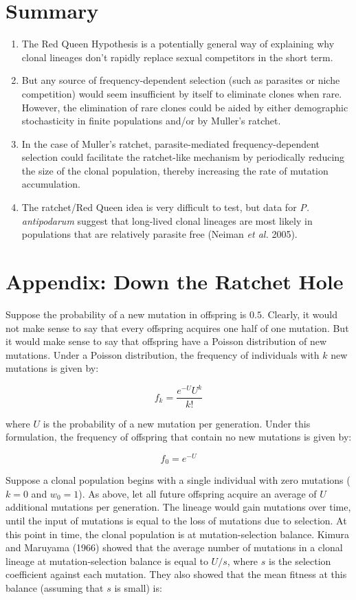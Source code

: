 \documentclass[
  letterpaper,
]{book}
\begin{document}
\section{Summary}\label{summary-4}

\begin{enumerate}
\def\labelenumi{\arabic{enumi}.}
\item
  The Red Queen Hypothesis is a potentially general way of explaining
  why clonal lineages don't rapidly replace sexual competitors in the
  short term.
\item
  But any source of frequency-dependent selection (such as parasites or
  niche competition) would seem insufficient by itself to eliminate
  clones when rare. However, the elimination of rare clones could be
  aided by either demographic stochasticity in finite populations and/or
  by Muller's ratchet.
\item
  In the case of Muller's ratchet, parasite-mediated frequency-dependent
  selection could facilitate the ratchet-like mechanism by periodically
  reducing the size of the clonal population, thereby increasing the
  rate of mutation accumulation.
\item
  The ratchet/Red Queen idea is very difficult to test, but data for
  \emph{P. antipodarum} suggest that long-lived clonal lineages are most
  likely in populations that are relatively parasite free (Neiman
  \emph{et al.} 2005).
\end{enumerate}

\section{Appendix: Down the Ratchet Hole}\label{sec-app-6}

Suppose the probability of a new mutation in offspring is \(0.5\).
Clearly, it would not make sense to say that every offspring acquires
one half of one mutation. But it would make sense to say that offspring
have a Poisson distribution of new mutations. Under a Poisson
distribution, the frequency of individuals with \(k\) new mutations is
given by:

\[f_k=\frac{e^{-U}U^k}{k!}\]

where \(U\) is the probability of a new mutation per generation. Under
this formulation, the frequency of offspring that contain no new
mutations is given by:

\[f_0=e^{-U}\]

Suppose a clonal population begins with a single individual with zero
mutations (\(k = 0\) and \(w_0 = 1\)). As above, let all future
offspring acquire an average of \(U\) additional mutations per
generation. The lineage would gain mutations over time, until the input
of mutations is equal to the loss of mutations due to selection. At this
point in time, the clonal population is at mutation-selection balance.
Kimura and Maruyama (1966) showed that the average number of mutations
in a clonal lineage at mutation-selection balance is equal to \(U/s\),
where \(s\) is the selection coefficient against each mutation. They
also showed that the mean fitness at this balance (assuming that \(s\)
is small) is:
\end{document}
